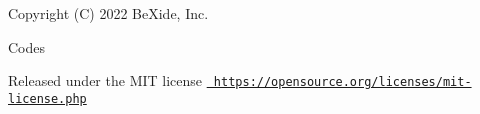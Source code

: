 Copyright (C) 2022 Be\+Xide, Inc.


\begin{DoxyItemize}
\item Codes
\begin{DoxyItemize}
\item Released under the MIT license \href{https://opensource.org/licenses/mit-license.php}{\texttt{ https\+://opensource.\+org/licenses/mit-\/license.\+php}} 
\end{DoxyItemize}
\end{DoxyItemize}